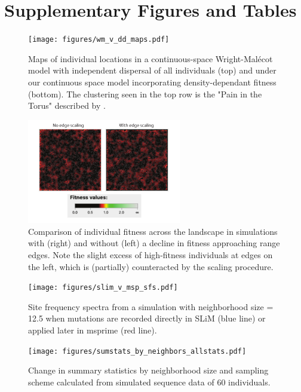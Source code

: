 \documentclass[10pt,twoside,lineno,hidelinks]{preprint}
\begin{document}
\setcounter{table}{0}
\renewcommand{\thetable}{S\arabic{table}}%
\setcounter{figure}{0}
\renewcommand{\thefigure}{S\arabic{figure}}%

\section{Supplementary Figures and Tables}

\begin{figure}[p]
\centering
\texttt{[image: figures/wm\_v\_dd\_maps.pdf]}
\caption{Maps of individual locations in a continuous-space Wright-Malécot model with independent dispersal of all individuals (top) and under our continuous space model incorporating density-dependant fitness (bottom). The clustering seen in the top row is the "Pain in the Torus" described by \citet{Felsenstein1975}.}
\label{fig:wm_v_dd} 
\end{figure}
\FloatBarrier


\begin{figure}[p]
\centering
\includegraphics[width=0.6\textwidth]{figures/edge_scaling_comp.pdf}
\caption{Comparison of individual fitness across the landscape in simulations with (right) and without (left) a decline in fitness approaching range edges. Note the slight excess of high-fitness individuals at edges on the left, which is (partially) counteracted by the scaling procedure.}
\label{fig:edge_scaling} 
\end{figure}
\FloatBarrier


\begin{figure}[p]
\centering
\texttt{[image: figures/slim\_v\_msp\_sfs.pdf]}
\caption{Site frequency spectra from a simulation with neighborhood size = 12.5 when mutations are recorded directly in SLiM (blue line) or applied later in msprime (red line).}
\label{fig:slim_v_msp_sfs} 
\end{figure}
\FloatBarrier



\begin{figure}[p]
\centering
\texttt{[image: figures/sumstats\_by\_neighbors\_allstats.pdf]}
\caption{Change in summary statistics by neighborhood size and sampling scheme calculated from simulated sequence data of 60 individuals.}
\label{fig:allsumstats} 
\end{figure}
\FloatBarrier
\end{document}
